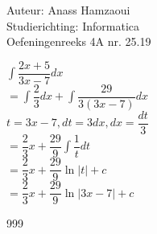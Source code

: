 \documentclass[a4paper]{article}
\begin{document}
  
\noindent \large Auteur: Anass Hamzaoui \\
\noindent \large Studierichting: Informatica \\
\noindent \large Oefeningenreeks 4A nr. 25.19 \\

\medskip

\normalsize

$\displaystyle\int \dfrac{2x + 5}{3x - 7} dx$ \\

$= \displaystyle\int \dfrac{2}{3} dx + \displaystyle\int \dfrac{29}{3(3x - 7)} dx$ \\

$t = 3x - 7, dt = 3 dx, dx = \dfrac{dt}{3}$ \\

$= \dfrac{2}{3}x + \dfrac{29}{9} \displaystyle\int \dfrac{1}{t} dt$ \\

$= \dfrac{2}{3}x + \dfrac{29}{9} \ln |t| + c$ \\

$= \dfrac{2}{3}x + \dfrac{29}{9} \ln |3x - 7| + c$ \\

\begin{thebibliography}{999}
\end{thebibliography}
\end{document}
